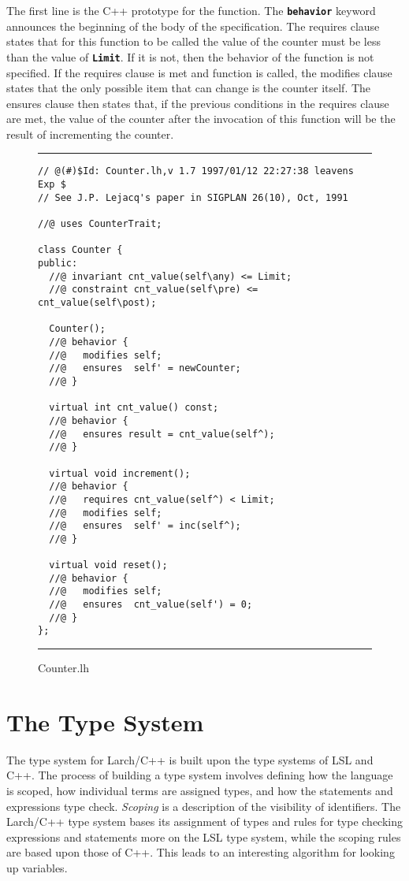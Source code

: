 \documentclass[12pt]{article} %
\newcommand{\reserved}[1]{\textbf{\texttt{#1}}} %
\newcommand{\UNSPACEFORBOX}{\vspace{-2ex}}
\newcommand{\HLINE}{\UNSPACEFORBOX%
\begin{flushleft}\rule{\textwidth}{0.01in}\end{flushleft}%
\UNSPACEFORBOX}
\newenvironment{BFIGURE}{

\begin{figure}
\small
\HLINE
}{
\HLINE
\normalsize
\end{figure}
}
\begin{document}
\noindent The first line is the C++ prototype for the function. The
\reserved{behavior} keyword announces the beginning of the body of the
specification. The requires clause states that for this function to be
called the value of the counter must be less than the value of
\reserved{Limit}. If it is not, then the behavior of the function is
not specified. If the requires clause is met and function is called,
the modifies clause states that the only possible item that can change
is the counter itself. The ensures clause then states that, if the
previous conditions in the requires clause are met, the value of the counter after the
invocation of this function will be the result of incrementing the
counter. 
 
\begin{BFIGURE}
\begin{verbatim}
// @(#)$Id: Counter.lh,v 1.7 1997/01/12 22:27:38 leavens Exp $
// See J.P. Lejacq's paper in SIGPLAN 26(10), Oct, 1991

//@ uses CounterTrait;

class Counter {
public:
  //@ invariant cnt_value(self\any) <= Limit;
  //@ constraint cnt_value(self\pre) <= cnt_value(self\post);

  Counter();
  //@ behavior {
  //@   modifies self;
  //@   ensures  self' = newCounter;
  //@ }

  virtual int cnt_value() const;
  //@ behavior {
  //@   ensures result = cnt_value(self^);
  //@ }

  virtual void increment();
  //@ behavior {
  //@   requires cnt_value(self^) < Limit;
  //@   modifies self;
  //@   ensures  self' = inc(self^);
  //@ }

  virtual void reset();
  //@ behavior {
  //@   modifies self;
  //@   ensures  cnt_value(self') = 0;
  //@ }
};

\end{verbatim}
\caption{Counter.lh}
\label{CounterSpec}
\end{BFIGURE}

%
\section{The Type System}
\label{typesystem}
The type system for Larch/C++ is built upon the type systems of LSL
and C++. The process of building a type system involves defining how
the language is scoped, how individual terms are assigned types, and
how the statements and expressions type check. \emph{Scoping} is a
description of the visibility of identifiers. The Larch/C++ type
system bases its assignment of types and rules for type checking
expressions and statements more on the LSL type system, while the
scoping rules are based upon those of C++. This leads to an
interesting algorithm for looking up variables.
\end{document}
